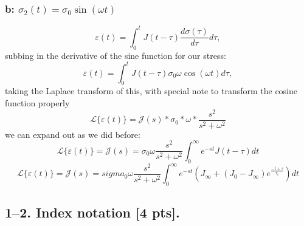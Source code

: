 \subsubsection*{b: $\sigma_2(t) = \sigma_0  \sin(\omega t)$}
\begin{equation}
    \varepsilon(t) = \int_0^t J(t-\tau) \frac{d\sigma(\tau)}{d\tau} d\tau,
\end{equation}
subbing in the derivative of the sine function for our stress:
\begin{equation}
    \varepsilon(t) = \int_0^t J(t-\tau) \sigma_0\omega\cos(\omega t) d\tau,
\end{equation}
taking the Laplace transform of this, with special note to transform the cosine function properly
\begin{equation}
    \mathcal{L}\{\varepsilon(t)\} = \mathcal{J}(s)*\sigma_0*\omega*\frac{s^2}{s^2+\omega^2}
\end{equation}
we can expand out as we did before:
\begin{equation}
    \mathcal{L}\{\varepsilon(t)\}=\mathcal{J}(s) = \sigma_0\omega\frac{s^2}{s^2+\omega^2}\int_0^{\infty}e^{-st}J(t-\tau)dt 
\end{equation}
\begin{equation}
    \mathcal{L}\{\varepsilon(t)\}=\mathcal{J}(s) = sigma_0\omega\frac{s^2}{s^2+\omega^2}\int_0^{\infty}e^{-st}(J_\infty + (J_0-J_\infty)e^{\frac{-t+\tau}{\tau_c}})dt 
\end{equation}

\bigskip
\subsection*{1--2. \textbf{Index notation} [4 pts].} 


